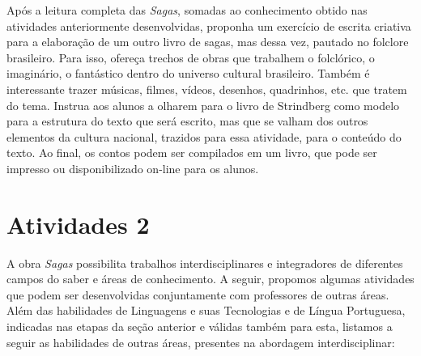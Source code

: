 \documentclass[12pt]{extarticle}
\begin{document}

Após a leitura completa das \emph{Sagas}, somadas ao
conhecimento obtido nas atividades anteriormente desenvolvidas, proponha
um exercício de escrita criativa para a elaboração de um outro livro de
sagas, mas dessa vez, pautado no folclore brasileiro. Para isso, ofereça
trechos de obras que trabalhem o folclórico, o imaginário, o fantástico
dentro do universo cultural brasileiro. Também é interessante trazer
músicas, filmes, vídeos, desenhos, quadrinhos, etc. que tratem do tema.
Instrua aos alunos a olharem para o livro de Strindberg como modelo para
a estrutura do texto que será escrito, mas que se valham dos outros
elementos da cultura nacional, trazidos para essa atividade, para o
conteúdo do texto. Ao final, os contos podem ser compilados em um livro,
que pode ser impresso ou disponibilizado on-line para os alunos.


\section{Atividades 2}




A obra \emph{Sagas} possibilita trabalhos interdisciplinares e
integradores de diferentes campos do saber e áreas de conhecimento. A
seguir, propomos algumas atividades que podem ser desenvolvidas
conjuntamente com professores de outras áreas. Além das habilidades de
Linguagens e suas Tecnologias e de Língua Portuguesa, indicadas nas
etapas da seção anterior e válidas também para esta, listamos a seguir
as habilidades de outras áreas, presentes na abordagem interdisciplinar:
\end{document}

